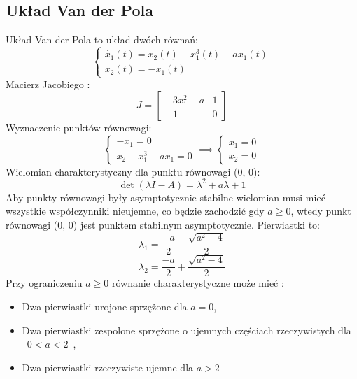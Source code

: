 \documentclass[a4paper,11pt]{article}
\begin{document}
\subsection{Układ Van der Pola}
Układ Van der Pola to układ dwóch równań:
\begin{equation*}
\begin{cases}
\dot{x_{1}}(t)=x_{2}(t)-x_{1}^{3}(t)-ax_{1}(t) \\
\dot{x_{2}}(t)=-x_{1}(t)
\end{cases}
\end{equation*}
Macierz Jacobiego : 
\begin{equation*}
J=\begin{bmatrix}
-3x_{1}^{2}-a & 1 \\
-1 & 0 
\end{bmatrix}
\end{equation*}
Wyznaczenie punktów równowagi: \\
\begin{equation*}
\begin{cases}
-x_{1}=0 \\
x_{2}-x_{1}^{3}-ax_{1}=0
\end{cases} \implies
\begin{cases}
x_{1}=0 \\
x_{2}=0
\end{cases}
\end{equation*}
Wielomian charakterystyczny dla punktu równowagi (0, 0):
\begin{equation*}
\det{(\lambda I-A)}=\lambda^{2}+a\lambda+1
\end{equation*}
Aby punkty równowagi były asymptotycznie stabilne wielomian musi mieć wszystkie współczynniki nieujemne, co będzie zachodzić gdy \(a\geq0\), wtedy punkt równowagi (0, 0) jest punktem stabilnym asymptotycznie.
Pierwiastki to: 
\begin{equation*}
\lambda_{1}=\frac{-a}{2}-\frac{\sqrt{a^{2}-4}}{2}
\end{equation*}
\begin{equation*}
\lambda_{2}=\frac{-a}{2}+\frac{\sqrt{a^{2}-4}}{2}
\end{equation*}
Przy ograniczeniu \( a\geq0 \) równanie charakterystyczne może mieć :\\
\begin{itemize}
\item Dwa pierwiastki urojone sprzężone dla \(a=0\),
\item Dwa pierwiastki zespolone sprzężone o ujemnych częściach rzeczywistych dla \mbox{ \(0<a<2\) },
\item Dwa pierwiastki rzeczywiste ujemne dla \(a>2\)
\end{itemize}
\end{document}
